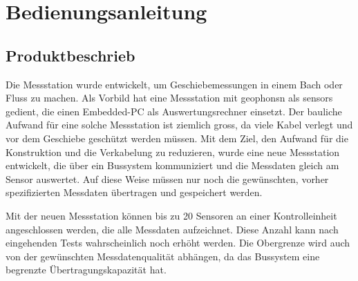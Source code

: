 %
%

\chapter{Bedienungsanleitung}\label{chap.bedienung}

\section{Produktbeschrieb}\label{sec.manualproduct}
Die Messstation wurde entwickelt, um Geschiebemessungen in einem Bach oder Fluss zu machen. Als Vorbild hat eine Messstation mit \glspl{geophon}n als \glspl{sensor} gedient, die einen Embedded-PC als Auswertungsrechner einsetzt. Der bauliche Aufwand für eine solche Messstation ist ziemlich gross, da viele Kabel verlegt und vor dem Geschiebe geschützt werden müssen. Mit dem Ziel, den Aufwand für die Konstruktion und die Verkabelung zu reduzieren, wurde eine neue Messstation entwickelt, die über ein Bussystem kommuniziert und die Messdaten gleich am Sensor auswertet. Auf diese Weise müssen nur noch die gewünschten, vorher spezifizierten Messdaten übertragen und gespeichert werden.

Mit der neuen Messstation können bis zu 20 Sensoren an einer Kontrolleinheit angeschlossen werden, die alle Messdaten aufzeichnet. Diese Anzahl kann nach eingehenden Tests wahrscheinlich noch erhöht werden. Die Obergrenze wird auch von der gewünschten Messdatenqualität abhängen, da das Bussystem eine begrenzte Übertragungskapazität hat.









